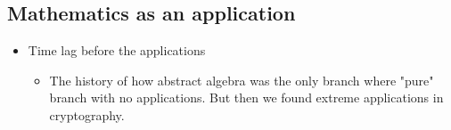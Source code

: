 \documentclass[10pt,conference]{IEEEtran}
\begin{document}
\begin{sloppy}
\newpage
\section{Mathematics as an application}%
\label{sec:mathematics_for_stimulating_intellectual_mind}

\begin{itemize}
    \item Time lag before the applications
        \begin{itemize}
            \item The history of how abstract algebra was the only branch where "pure" branch with no applications. But then we found extreme applications in cryptography.
        \end{itemize}
\end{itemize}






    \printbibliography
\end{sloppy}
\end{document}
